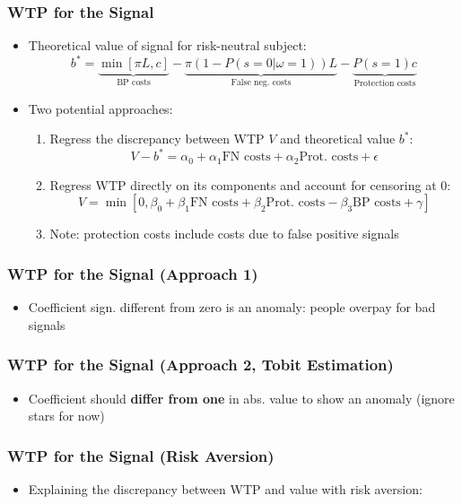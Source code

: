 \documentclass[11pt,hyperref={bookmarks=false}]{beamer}
\begin{document}
\begin{frame}
\frametitle{WTP for the Signal}
\begin{itemize}
\item Theoretical value of signal for risk-neutral subject:
$$b^*=\underbrace{\min[\pi L,c]}_{\text{BP costs}}-\underbrace{\pi(1-P(s=0|\omega=1))L}_{\text{False neg. costs}}-\underbrace{P(s=1)c}_{\text{Protection costs}}$$
\item Two potential approaches:
\begin{enumerate}
\item Regress the discrepancy between WTP $V$ and theoretical value $b^*$:
$$V-b^*=\alpha_0+\alpha_1\text{FN costs}+\alpha_2 \text{Prot. costs}+\epsilon$$
\item Regress WTP directly on its components and account for censoring at 0:
$$V=\min[0,\beta_0+\beta_1\text{FN costs}+\beta_2 \text{Prot. costs}-\beta_3\text{BP costs}+\gamma]$$
\item Note: protection costs include costs due to false positive signals
\end{enumerate}
\end{itemize}

\end{frame}


\begin{frame}
\frametitle{WTP for the Signal  (Approach 1)}
\begin{itemize}
\item Coefficient sign. different from zero is an anomaly: people overpay for bad signals
\end{itemize}
\footnotesize

\normalsize
\end{frame}

\begin{frame}
\frametitle{WTP for the Signal (Approach 2, Tobit Estimation)}
\begin{itemize}
\item Coefficient should \textbf{differ from one} in abs. value to show an anomaly (ignore stars for now)
\end{itemize}
\footnotesize

\normalsize
\end{frame}



\begin{frame}
\frametitle{WTP for the Signal (Risk Aversion)}
\begin{itemize}
\item Explaining the discrepancy between WTP and value with risk aversion:
\end{itemize}
\footnotesize

\end{frame}
\end{document}
